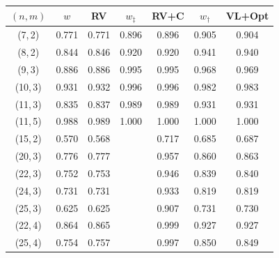 \begin{tabular}{@{}ccccccc@{}}
\toprule
\((n, m)\) & \(w\) & RV & \(w_{\ddagger}\) & RV+C & \(w_{\dagger}\) & VL+Opt \\
\midrule
(7,\,2) & 0.771 & 0.771 & 0.896 & 0.896 & 0.905 & 0.904 \\
(8,\,2) & 0.844 & 0.846 & 0.920 & 0.920 & 0.941 & 0.940 \\
(9,\,3) & 0.886 & 0.886 & 0.995 & 0.995 & 0.968 & 0.969 \\
(10,\,3) & 0.931 & 0.932 & 0.996 & 0.996 & 0.982 & 0.983 \\
(11,\,3) & 0.835 & 0.837 & 0.989 & 0.989 & 0.931 & 0.931 \\
(11,\,5) & 0.988 & 0.989 & 1.000 & 1.000 & 1.000 & 1.000 \\
\midrule
(15,\,2) & 0.570 & 0.568 & \text{--} & 0.717 & 0.685 & 0.687 \\
(20,\,3) & 0.776 & 0.777 & \text{--} & 0.957 & 0.860 & 0.863 \\
(22,\,3) & 0.752 & 0.753 & \text{--} & 0.946 & 0.839 & 0.840 \\
(24,\,3) & 0.731 & 0.731 & \text{--} & 0.933 & 0.819 & 0.819 \\
(25,\,3) & 0.625 & 0.625 & \text{--} & 0.907 & 0.731 & 0.730 \\
(22,\,4) & 0.864 & 0.865 & \text{--} & 0.999 & 0.927 & 0.927 \\
(25,\,4) & 0.754 & 0.757 & \text{--} & 0.997 & 0.850 & 0.849 \\
\bottomrule
\end{tabular}
